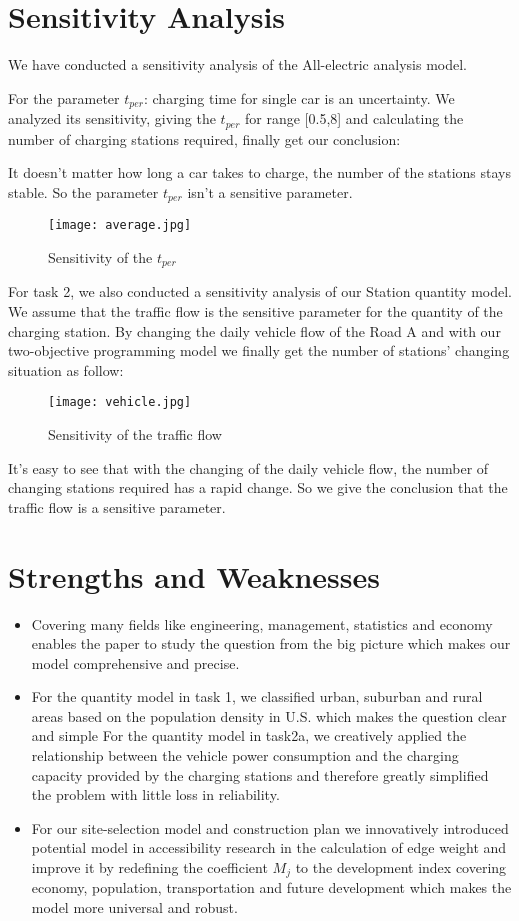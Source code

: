 \documentclass[12pt]{article}  %
\begin{document}
\section{Sensitivity Analysis}
We have conducted a sensitivity analysis of the All-electric analysis model.

For the parameter $t_{per}$: charging time for single car is an uncertainty. We analyzed its sensitivity, giving the $t_{per}$ for range [0.5,8] and calculating the number of charging stations required, finally get our conclusion:

It doesn't matter how long a car takes to charge, the number of the stations stays stable. So the parameter $t_{per}$ isn't a sensitive parameter.

\begin{figure}[H]
	\centering
	\texttt{[image: average.jpg]}
	\caption{Sensitivity of the $t_{per}$}\label{fig:16}
\end{figure}

For task 2, we also conducted a sensitivity analysis of our Station quantity model. We assume that the traffic flow is the sensitive parameter for the quantity of the charging station. By changing the daily vehicle flow of the Road A and with our two-objective programming model we finally get the number of stations' changing situation as follow:

\begin{figure}[H]
	\centering
	\texttt{[image: vehicle.jpg]}
	\caption{Sensitivity of the traffic flow}\label{fig:17}
\end{figure}

It's easy to see that with the changing of the daily vehicle flow, the number of changing stations required has a rapid change. So we give the conclusion that the traffic flow is a sensitive parameter.



\section{Strengths and Weaknesses}
\begin{itemize}
	\item Covering many fields like  engineering, management, statistics and economy enables the paper to study the question from the big picture which makes our model comprehensive and precise.
	\item For the quantity model in task 1, we classified urban, suburban and rural areas based on the population density in U.S. which makes the question clear and simple
	For the quantity model in task2a, we creatively applied the relationship between the vehicle power consumption and the charging capacity provided by the charging stations and therefore greatly simplified the problem with little loss in reliability.
	\item For our site-selection model and construction plan we innovatively introduced potential model in accessibility research in the calculation of edge weight and improve it by redefining the coefficient ${M_j}$ to the development index covering economy, population, transportation and future development which makes the model more universal and robust.
\end{itemize}
\end{document}

